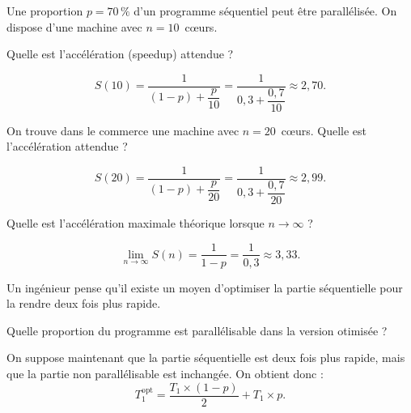 
\begingroup

\begin{exercice}
  \label{exo:introduction/amdahl}

  Une proportion $p=70\,\%$ d'un programme séquentiel peut être parallélisée. On dispose d'une machine avec $n=10$~c\oe urs.

  \begin{question} 
  \item Quelle est l'accélération (speedup) attendue ?
  \end{question}
  \begin{correction}
    $$ S(10)=\dfrac{1}{(1-p)+\dfrac{p}{10}} = \dfrac{1}{0,3+\dfrac{0,7}{10}} \approx 2,70. $$
  \end{correction}

  \begin{question} 
  \item On trouve dans le commerce une machine avec $n=20$~c\oe urs. Quelle est l'accélération attendue ?
  \end{question}
  \begin{correction}
    $$ S(20)=\dfrac{1}{(1-p)+\dfrac{p}{20}} = \dfrac{1}{0,3+\dfrac{0,7}{20}} \approx 2,99. $$
  \end{correction}

  \begin{question} 
  \item Quelle est l'accélération maximale théorique lorsque $n \to \infty$ ?
  \end{question}
  \begin{correction}
    $$ \lim_{n\to\infty} S(n) = \dfrac{1}{1-p} = \dfrac{1}{0,3} \approx 3,33. $$
  \end{correction}

  Un ingénieur pense qu'il existe un moyen d'optimiser la partie séquentielle pour la rendre deux fois plus rapide.

  \begin{question} 
  \item Quelle proportion du programme est parallélisable dans la version otimisée ? 
  \end{question}
  \begin{correction}
    On suppose maintenant que la partie séquentielle est deux fois plus rapide,
    mais que la partie non parallélisable est inchangée.
    On obtient donc : 
    $$T_1^{\mathrm{opt}} = \dfrac{T_1 \times (1-p)}{2} + T_1 \times p. $$


\end{correction}
\end{exercice}
